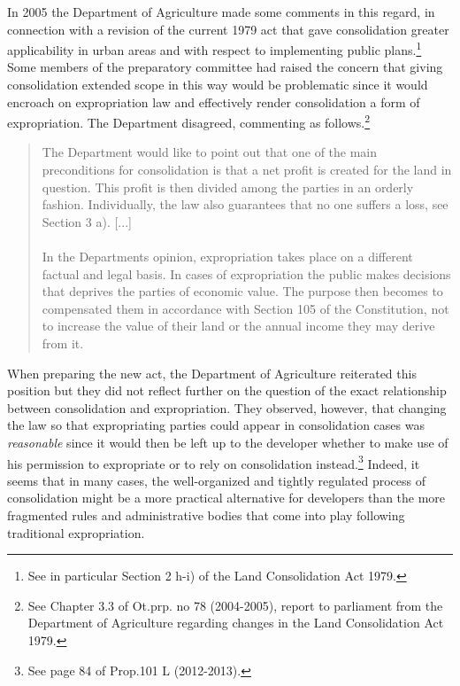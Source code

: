 \documentclass[10pt]{article} %
\begin{document}
In 2005 the Department of Agriculture made some comments in this regard, in connection with a revision of the current 1979 act that gave consolidation greater applicability in urban areas and with respect to implementing public plans.\footnote{See in particular Section 2 h-i) of the Land Consolidation Act 1979.} Some members of the preparatory committee had raised the concern that giving consolidation extended scope in this way would be problematic since it would encroach on expropriation law and effectively render consolidation a form of expropriation. The Department disagreed, commenting as follows.\footnote{See Chapter 3.3 of Ot.prp. no 78 (2004-2005), report to parliament from the Department of Agriculture regarding changes in the Land Consolidation Act 1979.}

\begin{quote}
The Department would like to point out that one of the main preconditions for consolidation is that a net profit is created for the land in question. This profit is then divided among the parties in an orderly fashion. Individually, the law also guarantees that no one suffers a loss, see Section 3 a). [...] \\ \\ In the Departments opinion, expropriation takes place on a different factual and legal basis. In cases of expropriation the public makes decisions that deprives the parties of economic value. The purpose then becomes to compensated them in accordance with Section 105 of the Constitution, not to increase the value of their land or the annual income they may derive from it.
\end{quote}

When preparing the new act, the Department of Agriculture reiterated this position but they did not reflect further on the question of the exact relationship between consolidation and expropriation. They observed, however, that changing the law so that expropriating parties could appear in consolidation cases was \emph{reasonable} since it would then be left up to the developer whether to make use of his permission to expropriate or to rely on consolidation instead.\footnote{See page 84 of Prop.101 L (2012-2013).} Indeed, it seems that in many cases, the well-organized and tightly regulated process of consolidation might be a more practical alternative for developers than the more fragmented rules and administrative bodies that come into play following traditional expropriation. 
\end{document}
